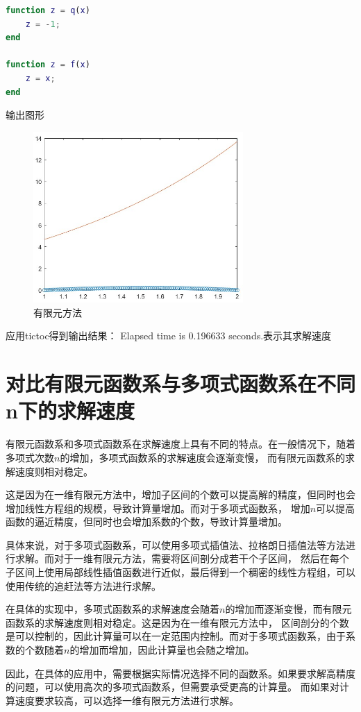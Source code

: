 \documentclass[12pt, a4paper, oneside]{ctexart}
\begin{document}
\begin{spacing}{2.0}
\begin{lstlisting}[language=MATLAB, caption=有限元]
function z = q(x)
    z = -1;
end

function z = f(x)
    z = x;
end


\end{lstlisting}
输出图形
\begin{figure}[H]
    \centering
    \includegraphics[width=8cm]{FEMfigure.jpg}
    \caption{有限元方法}
\end{figure}


应用tictoc得到输出结果：
Elapsed time is 0.196633 seconds.表示其求解速度
\section{对比有限元函数系与多项式函数系在不同n下的求解速度}
有限元函数系和多项式函数系在求解速度上具有不同的特点。在一般情况下，随着多项式次数$n$的增加，多项式函数系的求解速度会逐渐变慢，
而有限元函数系的求解速度则相对稳定。

这是因为在一维有限元方法中，增加子区间的个数可以提高解的精度，但同时也会增加线性方程组的规模，导致计算量增加。而对于多项式函数系，
增加$n$可以提高函数的逼近精度，但同时也会增加系数的个数，导致计算量增加。

具体来说，对于多项式函数系，可以使用多项式插值法、拉格朗日插值法等方法进行求解。而对于一维有限元方法，需要将区间剖分成若干个子区间，
然后在每个子区间上使用局部线性插值函数进行近似，最后得到一个稠密的线性方程组，可以使用传统的追赶法等方法进行求解。

在具体的实现中，多项式函数系的求解速度会随着$n$的增加而逐渐变慢，而有限元函数系的求解速度则相对稳定。这是因为在一维有限元方法中，
区间剖分的个数是可以控制的，因此计算量可以在一定范围内控制。而对于多项式函数系，由于系数的个数随着$n$的增加而增加，因此计算量也会随之增加。

因此，在具体的应用中，需要根据实际情况选择不同的函数系。如果要求解高精度的问题，可以使用高次的多项式函数系，但需要承受更高的计算量。
而如果对计算速度要求较高，可以选择一维有限元方法进行求解。





\end{spacing}{}
\end{document}
